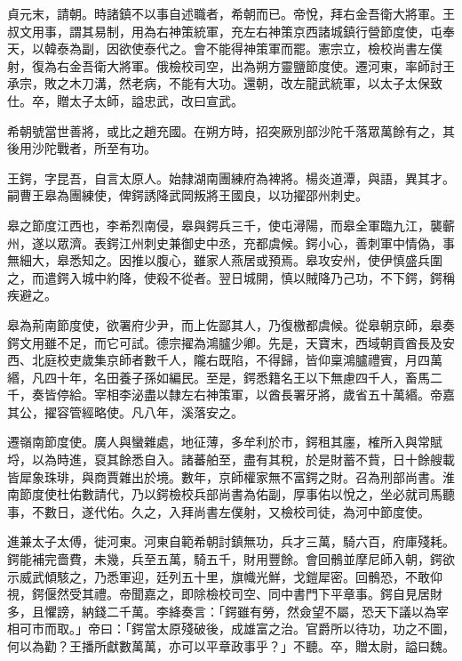 \begin{pinyinscope}
 貞元末，請朝。時諸鎮不以事自述職者，希朝而已。帝悅，拜右金吾衛大將軍。王叔文用事，謂其易制，用為右神策統軍，充左右神策京西諸城鎮行營節度使，屯奉天，以韓泰為副，因欲使泰代之。會不能得神策軍而罷。憲宗立，檢校尚書左僕射，復為右金吾衛大將軍。俄檢校司空，出為朔方靈鹽節度使。遷河東，率師討王承宗，敗之木刀溝，然老病，不能有大功。還朝，改左龍武統軍，以太子太保致仕。卒，贈太子太師，謚忠武，改曰宣武。



 希朝號當世善將，或比之趙充國。在朔方時，招突厥別部沙陀千落眾萬餘有之，其後用沙陀戰者，所至有功。



 王鍔，字昆吾，自言太原人。始隸湖南團練府為裨將。楊炎道潭，與語，異其才。嗣曹王皋為團練使，俾鍔誘降武岡叛將王國良，以功擢邵州刺史。



 皋之節度江西也，李希烈南侵，皋與鍔兵三千，使屯潯陽，而皋全軍臨九江，襲蘄州，遂以眾濟。表鍔江州刺史兼御史中丞，充都虞候。鍔小心，善刺軍中情偽，事無細大，皋悉知之。因推以腹心，雖家人燕居或預焉。皋攻安州，使伊慎盛兵圍之，而遣鍔入城中約降，使殺不從者。翌日城開，慎以賊降乃己功，不下鍔，鍔稱疾避之。



 皋為荊南節度使，欲署府少尹，而上佐鄙其人，乃復檄都虞候。從皋朝京師，皋奏鍔文用雖不足，而它可試。德宗擢為鴻臚少卿。先是，天寶末，西域朝貢酋長及安西、北庭校吏歲集京師者數千人，隴右既陷，不得歸，皆仰稟鴻臚禮賓，月四萬緡，凡四十年，名田養子孫如編民。至是，鍔悉籍名王以下無慮四千人，畜馬二千，奏皆停給。宰相李泌盡以隸左右神策軍，以酋長署牙將，歲省五十萬緡。帝嘉其公，擢容管經略使。凡八年，溪落安之。



 遷嶺南節度使。廣人與蠻雜處，地征薄，多牟利於市，鍔租其廛，榷所入與常賦埒，以為時進，裒其餘悉自入。諸蕃舶至，盡有其稅，於是財蓄不貲，日十餘艘載皆犀象珠琲，與商賈雜出於境。數年，京師權家無不富鍔之財。召為刑部尚書。淮南節度使杜佑數請代，乃以鍔檢校兵部尚書為佑副，厚事佑以悅之，坐必就司馬聽事，不數日，遂代佑。久之，入拜尚書左僕射，又檢校司徒，為河中節度使。



 進兼太子太傅，徙河東。河東自範希朝討鎮無功，兵才三萬，騎六百，府庫殘耗。鍔能補完嗇費，未幾，兵至五萬，騎五千，財用豐餘。會回鶻並摩尼師入朝，鍔欲示威武傾駭之，乃悉軍迎，廷列五十里，旗幟光鮮，戈鎧犀密。回鶻恐，不敢仰視，鍔偃然受其禮。帝聞嘉之，即除檢校司空、同中書門下平章事。鍔自見居財多，且懼謗，納錢二千萬。李絳奏言：「鍔雖有勞，然僉望不屬，恐天下議以為宰相可市而取。」帝曰：「鍔當太原殘破後，成雄富之治。官爵所以待功，功之不圖，何以為勸？王播所獻數萬萬，亦可以平章政事乎？」不聽。卒，贈太尉，謚曰魏。




\end{pinyinscope}
